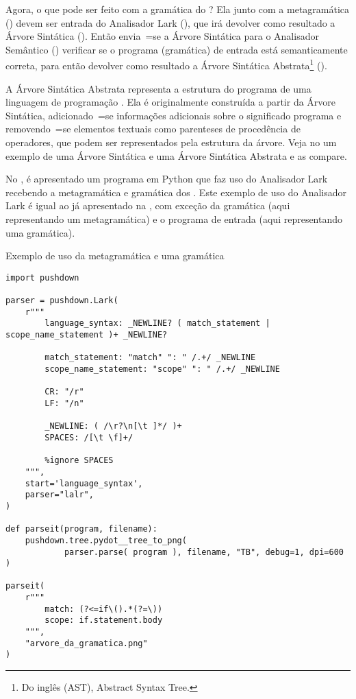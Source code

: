 Agora,
o que pode ser feito com a gramática do ?
Ela junto com a metagramática () devem ser entrada do Analisador Lark (),
que irá devolver como resultado a Árvore Sintática ().
Então envia~=se a Árvore Sintática para o Analisador Semântico () verificar se o programa (gramática) de entrada está semanticamente correta,
para então devolver como resultado a Árvore Sintática Abstrata\footnote{%
Do inglês (AST),
Abstract Syntax Tree.
}
().

A Árvore Sintática Abstrata representa a estrutura do programa de uma linguagem de programação \cite{improvingRefactoringSpeed,annotationAssistant}.
Ela é originalmente construída a partir da Árvore Sintática,
adicionado~=se informações adicionais sobre o significado programa e
removendo~=se elementos textuais como parenteses de procedência de operadores,
que podem ser representados pela estrutura da árvore.
Veja no  um exemplo de uma Árvore Sintática e
uma Árvore Sintática Abstrata e
as compare.

No ,
é apresentado um programa em Python que faz uso do Analisador Lark recebendo a metagramática e
gramática dos .
Este exemplo de uso do Analisador Lark é igual ao já apresentado na ,
com exceção da gramática (aqui representando um metagramática) e
o programa de entrada (aqui representando uma gramática).
\begin{code}
\caption{Exemplo de uso da metagramática e uma gramática}
\label{code:exemploDeUsoDaMetagramaticaEUmaGramatica}
\begin{verbatim}
import pushdown

parser = pushdown.Lark(
    r"""
        language_syntax: _NEWLINE? ( match_statement | scope_name_statement )+ _NEWLINE?

        match_statement: "match" ": " /.+/ _NEWLINE
        scope_name_statement: "scope" ": " /.+/ _NEWLINE

        CR: "/r"
        LF: "/n"

        _NEWLINE: ( /\r?\n[\t ]*/ )+
        SPACES: /[\t \f]+/

        %ignore SPACES
    """,
    start='language_syntax',
    parser="lalr",
)

def parseit(program, filename):
    pushdown.tree.pydot__tree_to_png(
            parser.parse( program ), filename, "TB", debug=1, dpi=600 )

parseit(
    r"""
        match: (?<=if\().*(?=\))
        scope: if.statement.body
    """,
    "arvore_da_gramatica.png"
)
\end{verbatim}
\end{code}

